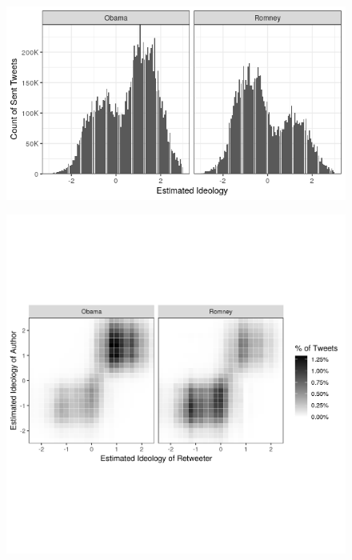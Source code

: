 \documentclass[../template.tex]{subfiles}
\begin{document}
\begin{figure}[h]
\centering
\includegraphics[scale=.75]{images/obama-romney hist.png}
\end{figure}

\begin{figure}[h]
\centering
\includegraphics[scale=.75]{images/heatmap.png}
\end{figure}
\end{document}
